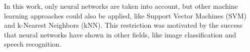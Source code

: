 



In this work, only neural networks are taken into account, but other machine learning approaches could also be applied, like Support Vector Machines (SVM) and k-Nearest Neighbors (kNN). This restriction was motivated by the success that neural networks have shown in other fields, like image classification and speech recognition.

